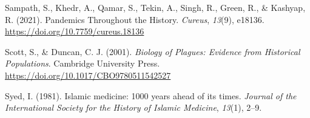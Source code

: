 \documentclass[
]{report}
\newlength{\cslhangindent}
\newenvironment{CSLReferences}[2] %
  {%
  \setlength{\parindent}{0pt}
  \ifodd #1 \everypar{\setlength{\hangindent}{\cslhangindent}}\ignorespaces\fi
  \ifnum #2 > 0
  \setlength{\parskip}{#2\baselineskip}
  \fi
}%
{}
\begin{document}
\begin{CSLReferences}{1}{0}
\leavevmode{}%
Sampath, S., Khedr, A., Qamar, S., Tekin, A., Singh, R., Green, R., \&
Kashyap, R. (2021). Pandemics {Throughout} the {History}. \emph{Cureus},
\emph{13}(9), e18136. \url{https://doi.org/10.7759/cureus.18136}

\leavevmode{}%
Scott, S., \& Duncan, C. J. (2001). \emph{Biology of {Plagues}:
{Evidence} from {Historical Populations}}. {Cambridge University Press}.
\url{https://doi.org/10.1017/CBO9780511542527}

\leavevmode{}%
Syed, I. (1981). Islamic medicine: 1000 years ahead of its times.
\emph{Journal of the International Society for the History of Islamic
Medicine}, \emph{13}(1), 2--9.

\end{CSLReferences}

\begin{appendix}
\end{appendix}



\label{NumDocumentPages}
\end{document}

